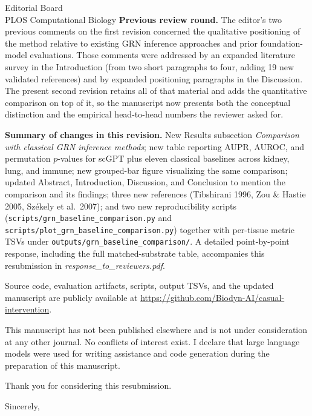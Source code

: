 \documentclass[11pt,letterpaper]{letter}
\begin{document}
\begin{letter}{Editorial Board\\
PLOS Computational Biology}
\textbf{Previous review round.} The editor's two previous comments on
the first revision concerned the qualitative positioning of the method
relative to existing GRN inference approaches and prior foundation-model
evaluations. Those comments were addressed by an expanded literature
survey in the Introduction (from two short paragraphs to four, adding 19
new validated references) and by expanded positioning paragraphs in the
Discussion. The present second revision retains all of that material and
adds the quantitative comparison on top of it, so the manuscript now
presents both the conceptual distinction and the empirical head-to-head
numbers the reviewer asked for.

\textbf{Summary of changes in this revision.} New Results subsection
\textit{Comparison with classical GRN inference methods}; new table
reporting AUPR, AUROC, and permutation $p$-values for scGPT plus eleven
classical baselines across kidney, lung, and immune; new grouped-bar
figure visualizing the same comparison; updated Abstract, Introduction,
Discussion, and Conclusion to mention the comparison and its findings;
three new references (Tibshirani 1996, Zou \& Hastie 2005, Sz\'ekely et
al.\ 2007); and two new reproducibility scripts
(\texttt{scripts/grn\_baseline\_comparison.py} and
\texttt{scripts/plot\_grn\_baseline\_comparison.py}) together with
per-tissue metric TSVs under \texttt{outputs/grn\_baseline\_comparison/}.
A detailed point-by-point response, including the full
matched-substrate table, accompanies this resubmission in
\textit{response\_to\_reviewers.pdf}.

Source code, evaluation artifacts, scripts, output TSVs, and the updated
manuscript are publicly available at
\url{https://github.com/Biodyn-AI/casual-intervention}.

This manuscript has not been published elsewhere and is not under
consideration at any other journal. No conflicts of interest exist. I
declare that large language models were used for writing assistance and
code generation during the preparation of this manuscript.

Thank you for considering this resubmission.

\closing{Sincerely,}

\end{letter}
\end{document}
